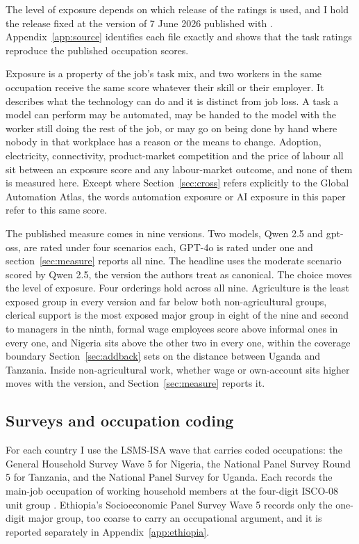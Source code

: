 The level of exposure depends on which release of the ratings is used, and I
hold the release fixed at the version of 7 June 2026 published with
\citet{althoff2026}. Appendix~\ref{app:source} identifies each file exactly and
shows that the task ratings reproduce the published occupation scores.

Exposure is a property of the
job's task mix, and two workers in the same occupation receive the same score
whatever their skill or their employer. It describes what the technology can do 
and it is distinct from job loss. A task a model can perform may be automated,
may be handed to the model with the worker still doing the rest of the job, or
may go on being done by hand where nobody in that workplace has a reason or the
means to change. Adoption, electricity, connectivity, product-market competition
and the price of labour all sit between an exposure score and any labour-market
outcome, and none of them is measured here. Except where
Section~\ref{sec:cross} refers explicitly to the Global Automation Atlas, the
words automation exposure or AI exposure in this paper refer to this same
score.

The published measure comes in nine versions. Two models, Qwen 2.5 and
gpt-oss, are rated under four scenarios each, GPT-4o is rated under one and 
section~\ref{sec:measure} reports all nine. The headline uses the moderate
scenario scored by Qwen 2.5, the version the authors treat as canonical. The
choice moves the level of exposure. Four orderings hold across all nine.
Agriculture is the least exposed group in every version and far below both
non-agricultural groups, clerical support is the most exposed major group in
eight of the nine and second to managers in the ninth, formal wage employees
score above informal ones in every one, and Nigeria sits above the other two
in every one, within the coverage boundary Section~\ref{sec:addback} sets on
the distance between Uganda and Tanzania. Inside non-agricultural work, whether
wage or own-account sits higher moves with the version, and
Section~\ref{sec:measure} reports it.

\subsection{Surveys and occupation coding}

For each country I use the LSMS-ISA wave that carries coded occupations: the
General Household Survey Wave 5 for Nigeria, the National Panel Survey Round 5
for Tanzania, and the National Panel Survey for Uganda. Each records the
main-job occupation of working household members at the four-digit ISCO-08 unit
group \citep{isco08}. Ethiopia's Socioeconomic Panel Survey Wave 5 records only
the one-digit major group, too coarse to carry an occupational argument, and it
is reported separately in Appendix~\ref{app:ethiopia}.

